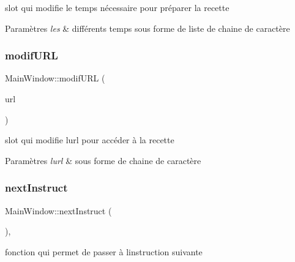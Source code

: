 slot qui modifie le temps nécessaire pour préparer la recette 


\begin{DoxyParams}{Paramètres}
{\em les} & différents temps sous forme de liste de chaine de caractère \\
\hline
\end{DoxyParams}
\mbox{\label{classMainWindow_a3620273f0e53b380d70df636400e8519}} 
\subsubsection{\texorpdfstring{modif\+U\+RL}{modifURL}}
{\footnotesize\ttfamily Main\+Window\+::modif\+U\+RL (\begin{DoxyParamCaption}\item[{Q\+String}]{url }\end{DoxyParamCaption})\hspace{0.3cm}{\ttfamily [slot]}}



slot qui modifie l\textquotesingle{}url pour accéder à la recette 


\begin{DoxyParams}{Paramètres}
{\em l\textquotesingle{}url} & sous forme de chaine de caractère \\
\hline
\end{DoxyParams}
\mbox{\label{classMainWindow_a0b79b7ea071fc3a4baa45f8394052ffd}} 
\subsubsection{\texorpdfstring{next\+Instruct}{nextInstruct}}
{\footnotesize\ttfamily Main\+Window\+::next\+Instruct (\begin{DoxyParamCaption}{ }\end{DoxyParamCaption})\hspace{0.3cm}{\ttfamily [private]}, {\ttfamily [slot]}}



fonction qui permet de passer à l\textquotesingle{}instruction suivante 

\mbox{\label{classMainWindow_a7870a8093d512baa96412b5fcadaaa87}} 
